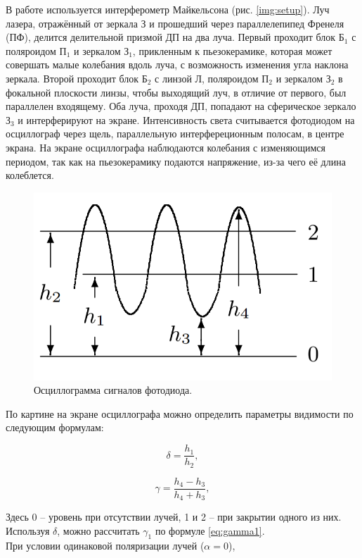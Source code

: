 \documentclass[a4paper, 12pt]{article}
\begin{document}
В работе используется интерферометр Майкельсона (рис. \ref{img:setup}). Луч лазера, отражённый от зеркала З и прошедший через параллелепипед Френеля (ПФ), делится делительной призмой ДП на два луча. Первый проходит блок $Б_1$ с поляроидом $П_1$ и зеркалом $З_1$, прикленным к пьезокерамике, которая может совершать малые колебания вдоль луча, с возможность изменения угла наклона зеркала. Второй проходит блок $Б_2$ с линзой Л, поляроидом $П_2$ и зеркалом $З_2$ в фокальной плоскости линзы, чтобы выходящий луч, в отличие от первого, был параллелен входящему. Оба луча, проходя ДП, попадают на сферическое зеркало $З_3$ и интерферируют на экране. Интенсивность света считывается фотодиодом на осциллограф через щель, параллельную интерфереционным полосам, в центре экрана. На экране осциллографа наблюдаются колебания с изменяющимся периодом, так как на пьезокерамику подаются напряжение, из-за чего её длина колеблется.

\begin{figure}
    \centering
    \includegraphics[scale = 0.5]{oscilograph.png}
    \caption{Осциллограмма сигналов фотодиода.}
\end{figure}

По картине на экране осциллографа можно определить параметры видимости по следующим формулам:

\begin{equation}
    \delta = \dfrac{h_1}{h_2},
\end{equation}

\begin{equation}
    \gamma = \dfrac{h_4 - h_3}{h_4 + h_3},
\end{equation}

Здесь 0 -- уровень при отсутствии лучей, 1 и 2 -- при закрытии одного из них. Используя $\delta$, можно рассчитать $\gamma_1$ по формуле \eqref{eq:gamma1}.\\ 
При условии одинаковой поляризации лучей ($\alpha = 0$),
\end{document}
